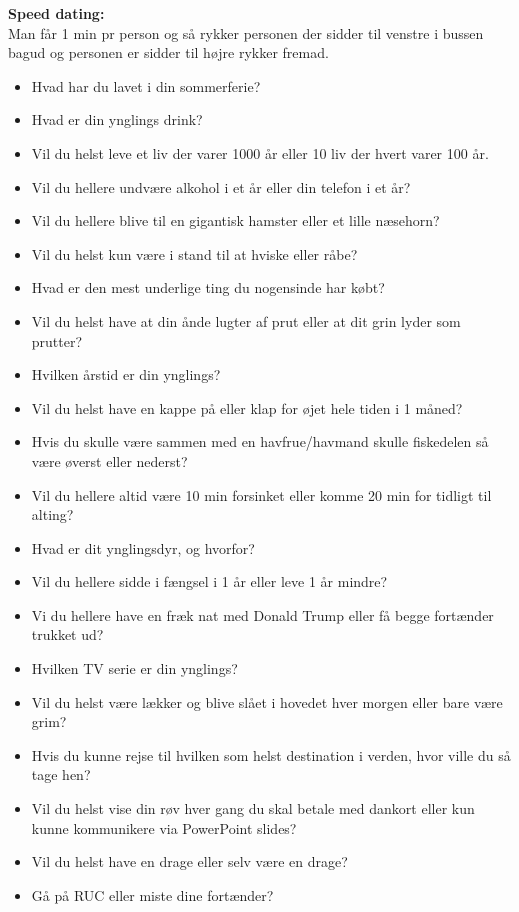 \textbf{Speed dating:}\\
Man får 1 min pr person og så rykker personen der sidder til venstre i bussen bagud og personen er sidder til højre rykker fremad. 
\begin{itemize}
    \item Hvad har du lavet i din sommerferie?
    \item Hvad er din ynglings drink?
    \item Vil du helst leve et liv der varer 1000 år eller 10 liv der hvert varer 100 år.
    \item Vil du hellere undvære alkohol i et år eller din telefon i et år? 
    \item Vil du hellere blive til en gigantisk hamster eller et lille næsehorn?
    \item Vil du helst kun være i stand til at hviske eller råbe?
    \item Hvad er den mest underlige ting du nogensinde har købt?
    \item Vil du helst have at din ånde lugter af prut eller at dit grin lyder som prutter?
    \item Hvilken årstid er din ynglings?
    \item Vil du helst have en kappe på eller klap for øjet hele tiden i 1 måned?
    \item Hvis du skulle være sammen med en havfrue/havmand skulle fiskedelen så være øverst eller nederst?
    \item Vil du hellere altid være 10 min forsinket eller komme 20 min for tidligt til alting?
    \item Hvad er dit ynglingsdyr, og hvorfor?
    \item Vil du hellere sidde i fængsel i 1 år eller leve 1 år mindre?
    \item Vi du hellere have en fræk nat med Donald Trump eller få begge fortænder trukket ud?
    \item Hvilken TV serie er din ynglings?
    \item Vil du helst være lækker og blive slået i hovedet hver morgen eller bare være grim?
    \item Hvis du kunne rejse til hvilken som helst destination i verden, hvor ville du så tage hen?
    \item Vil du helst vise din røv hver gang du skal betale med dankort eller kun kunne kommunikere via PowerPoint slides?
    \item Vil du helst have en drage eller selv være en drage?
    \item Gå på RUC eller miste dine fortænder?

\end{itemize}
